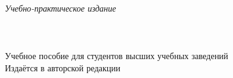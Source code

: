 \newpage
\thispagestyle{empty}
~\vfill
\begin{centering}
  \textit{Учебно-практическое издание}\\[18pt]
  \AuthorI\\[6pt]
  \textsc{\Title}\\[6pt]
  \PubType\\[18pt]
  Учебное пособие для студентов высших учебных заведений\\[18pt]
  Издаётся в авторской редакции\\
\end{centering}
\vspace{3cm}
